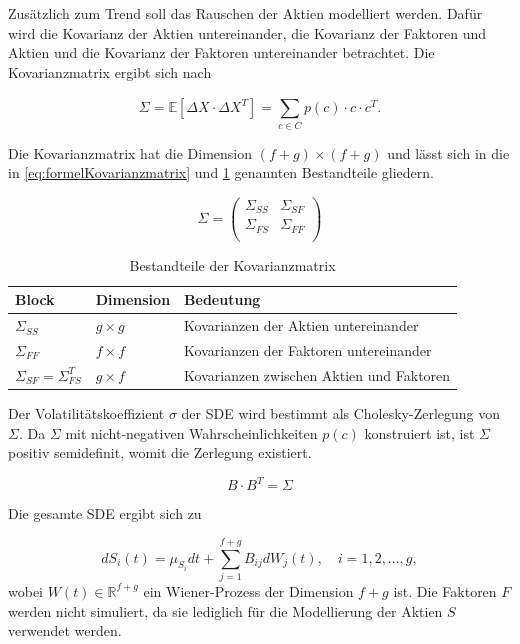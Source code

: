 Zusätzlich zum Trend soll das Rauschen der Aktien modelliert werden. Dafür wird die Kovarianz der Aktien untereinander, die Kovarianz der Faktoren und Aktien und die Kovarianz der Faktoren untereinander betrachtet. Die Kovarianzmatrix ergibt sich nach

\[
    \Sigma = \mathbb{E}[\Delta X \cdot \Delta X^T] = \sum_{c \in C}^{} p(c) \cdot c \cdot c^T.
\]

Die Kovarianzmatrix hat die Dimension $(f+g) \times (f+g)$ und lässt sich in die in \cref{eq:formelKovarianzmatrix} und \cref{tab:Kovarianzmatrix} genannten Bestandteile gliedern.

\begin{equation}\label{eq:formelKovarianzmatrix}
    \Sigma =
    \begin{pmatrix}
        \Sigma_{SS} & \Sigma_{SF} \\
        \Sigma_{FS} & \Sigma_{FF} \\
    \end{pmatrix}
\end{equation}

\begin{table}[h]
    \centering
    \begin{tabular}{lll}
        \toprule
        \textbf{Block}                & \textbf{Dimension} & \textbf{Bedeutung}                       \\ \midrule
        $\Sigma_{SS}$                 & $g \times g$       & Kovarianzen der Aktien untereinander     \\ \addlinespace
        $\Sigma_{FF}$                 & $f \times f$       & Kovarianzen der Faktoren untereinander   \\ \addlinespace
        $\Sigma_{SF} = \Sigma_{FS}^T$ & $g \times f$       & Kovarianzen zwischen Aktien und Faktoren \\ \bottomrule
    \end{tabular}
    \caption{Bestandteile der Kovarianzmatrix}\label{tab:Kovarianzmatrix}
\end{table}

Der Volatilitätskoeffizient $\sigma$ der \ac{SDE} wird bestimmt als Cholesky-Zerlegung von $\Sigma$. Da $\Sigma$ mit nicht-negativen Wahrscheinlichkeiten $p(c)$ konstruiert ist, ist $\Sigma$ positiv semidefinit, womit die Zerlegung existiert.

\[
    B \cdot B^T = \Sigma
\]

Die gesamte \ac{SDE} ergibt sich zu

\[
    dS_i(t) = \mu_{S_i} dt + \sum_{j=1}^{f+g}B_{ij} dW_j(t),\quad i=1, 2, \dots, g,
\]
wobei $W(t) \in \mathbb{R}^{f+g}$ ein Wiener-Prozess der Dimension $f+g$ ist. Die Faktoren $F$ werden nicht simuliert, da sie lediglich für die Modellierung der Aktien $S$ verwendet werden.

